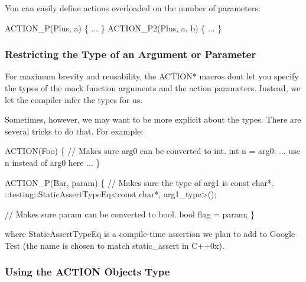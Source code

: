 You can easily define actions overloaded on the number of parameters\+: 
\begin{DoxyCode}
ACTION\_P(Plus, a) \{ ... \}
ACTION\_P2(Plus, a, b) \{ ... \}
\end{DoxyCode}


\subsubsection*{Restricting the Type of an Argument or Parameter}

For maximum brevity and reusability, the {\ttfamily A\+C\+T\+I\+O\+N$\ast$} macros don\textquotesingle{}t let you specify the types of the mock function arguments and the action parameters. Instead, we let the compiler infer the types for us.

Sometimes, however, we may want to be more explicit about the types. There are several tricks to do that. For example\+: 
\begin{DoxyCode}
ACTION(Foo) \{
  // Makes sure arg0 can be converted to int.
  int n = arg0;
  ... use n instead of arg0 here ...
\}

ACTION\_P(Bar, param) \{
  // Makes sure the type of arg1 is const char*.
  ::testing::StaticAssertTypeEq<const char*, arg1\_type>();

  // Makes sure param can be converted to bool.
  bool flag = param;
\}
\end{DoxyCode}
 where {\ttfamily Static\+Assert\+Type\+Eq} is a compile-\/time assertion we plan to add to Google Test (the name is chosen to match {\ttfamily static\+\_\+assert} in C++0x).

\subsubsection*{Using the A\+C\+T\+I\+ON Object\textquotesingle{}s Type}

